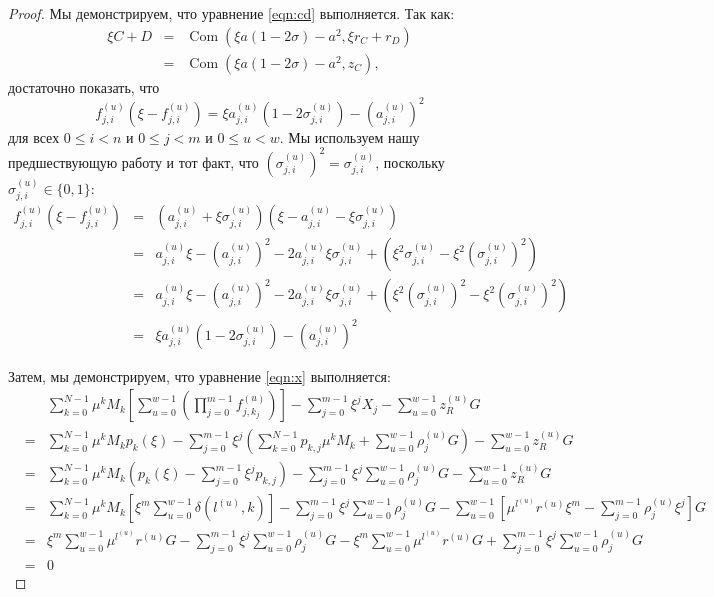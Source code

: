 \documentclass{article}
\newcommand{\com}{\operatorname{Com}}
\newcommand{\sumj}{\sum_{j=0}^{m-1}}
\newcommand{\sumk}{\sum_{k=0}^{N-1}}
\newcommand{\sumu}{\sum_{u=0}^{w-1}}
\theoremstyle{definition}
\begin{document}
\begin{proof}
Мы демонстрируем, что уравнение \ref{eqn:cd} выполняется.
Так как:
\begin{eqnarray*}
\xi C + D &=& \com(\xi a(1 - 2\sigma) - a^2,\xi r_C + r_D) \\
&=& \com(\xi a(1 - 2\sigma) - a^2,z_C),
\end{eqnarray*}
достаточно показать, что $$f_{j,i}^{(u)}\left( \xi - f_{j,i}^{(u)} \right) = \xi a_{j,i}^{(u)}\left( 1 - 2\sigma_{j,i}^{(u)} \right) - \left(a_{j,i}^{(u)}\right)^2$$ для всех $0 \leq i < n$ и $0 \leq j < m$ и $0 \leq u < w$.
Мы используем нашу предшествующую работу и тот факт, что $\left(\sigma_{j,i}^{(u)}\right)^2 = \sigma_{j,i}^{(u)}$, поскольку $\sigma_{j,i}^{(u)} \in \{0,1\}$:
\begin{eqnarray*}
f_{j,i}^{(u)}\left( \xi - f_{j,i}^{(u)} \right) &=& \left( a_{j,i}^{(u)} + \xi\sigma_{j,i}^{(u)} \right)\left( \xi - a_{j,i}^{(u)} - \xi\sigma_{j,i}^{(u)} \right) \\
&=& a_{j,i}^{(u)}\xi - \left(a_{j,i}^{(u)}\right)^2 - 2a_{j,i}^{(u)}\xi\sigma_{j,i}^{(u)} + \left( \xi^2\sigma_{j,i}^{(u)} - \xi^2\left(\sigma_{j,i}^{(u)}\right)^2 \right) \\
&=& a_{j,i}^{(u)}\xi - \left(a_{j,i}^{(u)}\right)^2 - 2a_{j,i}^{(u)}\xi\sigma_{j,i}^{(u)} + \left( \xi^2\left(\sigma_{j,i}^{(u)}\right)^2 - \xi^2\left(\sigma_{j,i}^{(u)}\right)^2 \right) \\
&=& \xi a_{j,i}^{(u)}\left( 1 - 2\sigma_{j,i}^{(u)} \right) - \left(a_{j,i}^{(u)}\right)^2
\end{eqnarray*}

Затем, мы демонстрируем, что уравнение \ref{eqn:x} выполняется:
\begin{eqnarray*}
&& \sumk \mu^kM_k \left[ \sumu \left( \prod_{j=0}^{m-1} f^{(u)}_{j,k_j} \right) \right] - \sumj \xi^jX_j - \sumu z^{(u)}_RG \\
&=& \sumk \mu^kM_k p_k(\xi) - \sumj \xi^j \left( \sumk p_{k,j}\mu^kM_k + \sumu \rho^{(u)}_jG \right) - \sumu z^{(u)}_RG \\
&=& \sumk \mu^kM_k \left( p_k(\xi) - \sumj \xi^j p_{k,j} \right) - \sumj \xi^j \sumu \rho^{(u)}_jG - \sumu z^{(u)}_RG \\
&=& \sumk \mu^kM_k \left[ \xi^m \sumu \delta\left( l^{(u)},k \right) \right] - \sumj \xi^j \sumu \rho^{(u)}_jG - \sumu\left[ \mu^{l^{(u)}}r^{(u)}\xi^m - \sumj \rho^{(u)}_j\xi^j \right]G \\
&=& \xi^m\sumu \mu^{l^{(u)}}r^{(u)}G - \sumj \xi^j \sumu \rho^{(u)}_jG - \xi^m\sumu \mu^{l^{(u)}}r^{(u)}G + \sumj \xi^j \sumu \rho^{(u)}_jG \\
&=& 0
\end{eqnarray*}


\end{proof}
\end{document}
